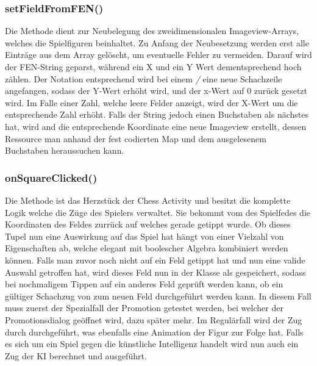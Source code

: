 \subsubsection{setFieldFromFEN()}

Die Methode  dient zur Neubelegung des zweidimensionalen 
Imageview-Arrays, welches die Spielfiguren beinhaltet. Zu Anfang der 
Neubesetzung werden erst alle Einträge aus dem Array gelöscht, um eventuelle 
Fehler zu vermeiden. Darauf wird der FEN-String geparst, während ein X und ein Y 
Wert dementsprechend hoch zählen. Der Notation entsprechend wird bei einem 
\emph{/} eine neue Schachzeile angefangen, sodass der Y-Wert erhöht wird, und 
der x-Wert auf 0 zurück gesetzt wird. Im Falle einer Zahl, welche leere Felder 
anzeigt, wird der X-Wert um die entsprechende Zahl erhöht. Falls der String 
jedoch einen Buchstaben als nächstes hat, wird and die entsprechende Koordinate 
eine neue Imageview erstellt, dessen Ressource man anhand der fest codierten Map 
und dem ausgelesenem Buchstaben heraussuchen kann.

\subsubsection{onSquareClicked()}

Die Methode  ist das Herzstück der Chess Activity und
besitzt die komplette Logik welche die Züge des Spielers verwaltet. Sie bekommt
vom  des Spielfedes die Koordinaten des Feldes zurrück auf
welches gerade getippt wurde. Ob dieses Tupel nun eine Auswirkung auf das Spiel
hat hängt von einer Vielzahl von Eigenschaften ab, welche elegant mit boolescher
Algebra kombiniert werden können. Falls man zuvor noch nicht auf ein Feld
getippt hat und nun eine valide Auswahl getroffen hat, wird dieses Feld nun in
der Klasse als  gespeichert, sodass bei nochmaligem Tippen auf ein
anderes Feld geprüft werden kann, ob ein gültiger Schachzug von 
zum neuen Feld durchgeführt werden kann. In diesem Fall muss zuerst der
Spezialfall der Promotion getestet werden, bei welcher der Promotionsdialog
geöffnet wird, dazu später mehr. Im Regulärfall wird der Zug durch
 durchgeführt, was ebenfalls eine Animation der Figur zur
Folge hat. Falls es sich um ein Spiel gegen die künstliche Intelligenz handelt
wird nun auch ein Zug der KI berechnet und ausgeführt.

